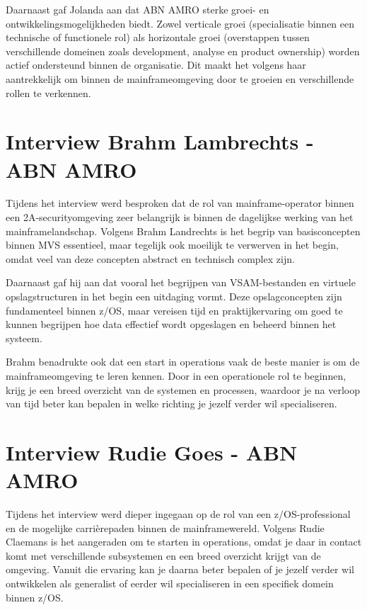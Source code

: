 Daarnaast gaf Jolanda aan dat ABN AMRO sterke groei- en ontwikkelingsmogelijkheden biedt. Zowel verticale groei (specialisatie binnen een technische of functionele rol) als horizontale groei (overstappen tussen verschillende domeinen zoals development, analyse en product ownership) worden actief ondersteund binnen de organisatie. Dit maakt het volgens haar aantrekkelijk om binnen de mainframeomgeving door te groeien en verschillende rollen te verkennen.


\section{Interview Brahm Lambrechts - ABN AMRO}

Tijdens het interview werd besproken dat de rol van mainframe-operator binnen een 2A-securityomgeving zeer belangrijk is binnen de dagelijkse werking van het mainframelandschap. Volgens Brahm Landrechts is het begrip van basisconcepten binnen MVS essentieel, maar tegelijk ook moeilijk te verwerven in het begin, omdat veel van deze concepten abstract en technisch complex zijn.

Daarnaast gaf hij aan dat vooral het begrijpen van VSAM-bestanden en virtuele opslagstructuren in het begin een uitdaging vormt. Deze opslagconcepten zijn fundamenteel binnen z/OS, maar vereisen tijd en praktijkervaring om goed te kunnen begrijpen hoe data effectief wordt opgeslagen en beheerd binnen het systeem.

Brahm benadrukte ook dat een start in operations vaak de beste manier is om de mainframeomgeving te leren kennen. Door in een operationele rol te beginnen, krijg je een breed overzicht van de systemen en processen, waardoor je na verloop van tijd beter kan bepalen in welke richting je jezelf verder wil specialiseren.

\section{Interview Rudie Goes - ABN AMRO}

Tijdens het interview werd dieper ingegaan op de rol van een z/OS-professional en de mogelijke carrièrepaden binnen de mainframewereld. Volgens Rudie Claemans is het aangeraden om te starten in operations, omdat je daar in contact komt met verschillende subsystemen en een breed overzicht krijgt van de omgeving. Vanuit die ervaring kan je daarna beter bepalen of je jezelf verder wil ontwikkelen als generalist of eerder wil specialiseren in een specifiek domein binnen z/OS.

